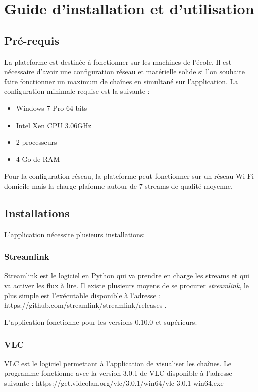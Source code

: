 \documentclass{polytech/polytech}
\begin{document}
\chapter{Guide d'installation et d'utilisation}


\section{Pré-requis}


La plateforme est destinée à fonctionner sur les machines de l’école. Il est nécessaire d'avoir une configuration réseau et matérielle solide si l'on souhaite faire fonctionner un maximum de chaînes en simultané sur l'application. La configuration minimale requise est la suivante :

\begin{itemize}
	\item Windows 7 Pro 64 bits
	\item Intel Xen CPU 3.06GHz
	\item 2 processeurs
	\item 4 Go de RAM
\end{itemize}


Pour la configuration réseau, la plateforme peut fonctionner sur un réseau Wi-Fi domicile mais la charge plafonne autour de 7 streams de qualité moyenne.


\section{Installations}

L'application nécessite plusieurs installations:

\subsection{Streamlink}

Streamlink est le logiciel en Python qui va prendre en charge les streams et qui va activer les flux à lire. Il existe plusieurs moyens de se procurer \textit{streamlink}, le plus simple est l'exécutable disponible à l'adresse : https://github.com/streamlink/streamlink/releases .

L'application fonctionne pour les versions 0.10.0 et supérieurs.

\subsection{VLC}

VLC est le logiciel permettant à l'application de visualiser les chaînes. Le programme  fonctionne avec la version 3.0.1 de VLC disponible à l'adresse suivante : https://get.videolan.org/vlc/3.0.1/win64/vlc-3.0.1-win64.exe
\end{document}
